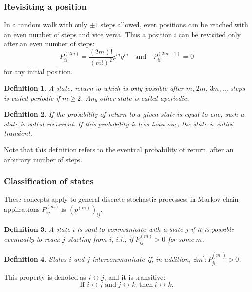 \documentclass{article}
\newtheorem{definition}{Definition}
\begin{document}
\subsubsection{Revisiting a position}
In a random walk with only $\pm1$ steps allowed, even positions can be reached with an even number of steps and vice versa. Thus a position $i$ can be revisited only after an even number of steps:
\begin{equation}
    P_{ii}^{(2m)} = \frac{(2m)!}{(m!)^2}p^m q^m\quad\text{and}\quad P_{ii}^{(2m-1)}=0
\end{equation}
for any initial position.
\begin{definition}
    A state, return to which is only possible after $m,\,2m,\,3m,\ldots$ steps is called periodic if $m\geq2$. Any other state is called aperiodic.
\end{definition}
\begin{definition}
    If the probability of return to a given state is equal to one, such a state is called recurrent. If this probability is less than one, the state is called transient.
\end{definition}
Note that this definition refers to the eventual probability of return, after an arbitrary number of steps.

\subsubsection{Classification of states}
These concepts apply to general discrete stochastic processes; in Markov chain applications $P_{ij}^{(m)}$ is $(p^{(m)})_{ij}$.
\begin{definition}
    A state $i$ is said to communicate with a state $j$ if it is possible eventually to reach $j$ starting from $i$, i.i., if $P_{ij}^{(m)}>0$ for some $m$.
\end{definition}
\begin{definition}
    States $i$ and $j$ intercommunicate if, in addition, $\exists m^\prime:P_{ji}^{(m^\prime)}>0$.
\end{definition}
This property is denoted as $i \leftrightarrow j$, and it is transitive:
\begin{equation}
    \text{If }i\leftrightarrow j\text{ and }j\leftrightarrow k\text{, then }i\leftrightarrow k.
\end{equation}
\end{document}
